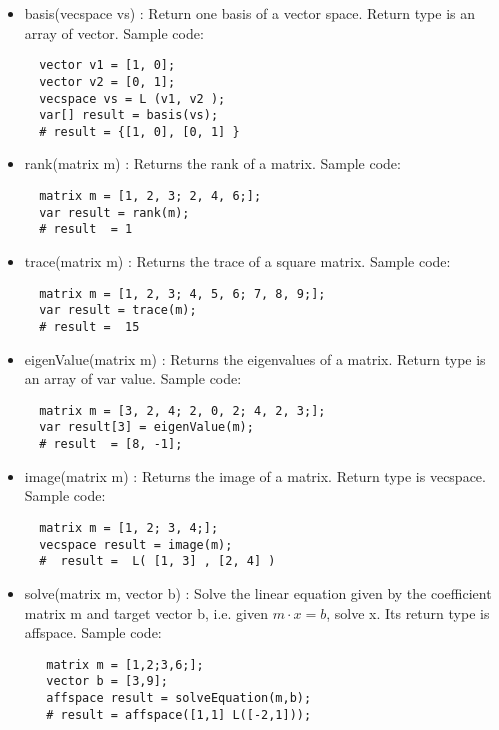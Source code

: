 \documentclass[12pt]{article} %
\begin{document}
\begin{itemize}
\item basis(vecspace vs)
: Return one basis of a vector space. Return type is an array of vector. Sample code:
\begin{lstlisting}
  vector v1 = [1, 0];
  vector v2 = [0, 1];
  vecspace vs = L (v1, v2 );
  var[] result = basis(vs);
  # result = {[1, 0], [0, 1] }
\end{lstlisting}

\item rank(matrix m)
: Returns the rank of a matrix. Sample code:
\begin{lstlisting}
  matrix m = [1, 2, 3; 2, 4, 6;];
  var result = rank(m);
  # result  = 1
\end{lstlisting}

\item trace(matrix m)
: Returns the trace of a square matrix. Sample code:
\begin{lstlisting}
  matrix m = [1, 2, 3; 4, 5, 6; 7, 8, 9;];
  var result = trace(m);
  # result =  15
\end{lstlisting}

\item eigenValue(matrix m)
: Returns the eigenvalues of a matrix. Return type is an array of var value. Sample code:
\begin{lstlisting}
  matrix m = [3, 2, 4; 2, 0, 2; 4, 2, 3;];
  var result[3] = eigenValue(m);
  # result  = [8, -1];
\end{lstlisting}

\item image(matrix m)
: Returns the image of a matrix. Return type is vecspace. Sample code:
\begin{lstlisting}
  matrix m = [1, 2; 3, 4;];
  vecspace result = image(m);
  #  result =  L( [1, 3] , [2, 4] )
\end{lstlisting}

\item solve(matrix m, vector b)
: Solve the linear equation given by the coefficient matrix m and target vector b, i.e. given $m\cdot x = b$, solve x. Its return type is affspace. Sample code:
\begin{lstlisting}
   matrix m = [1,2;3,6;]; 
   vector b = [3,9];
   affspace result = solveEquation(m,b);
   # result = affspace([1,1] L([-2,1]));
\end{lstlisting}
\end{itemize}





\end{document}
